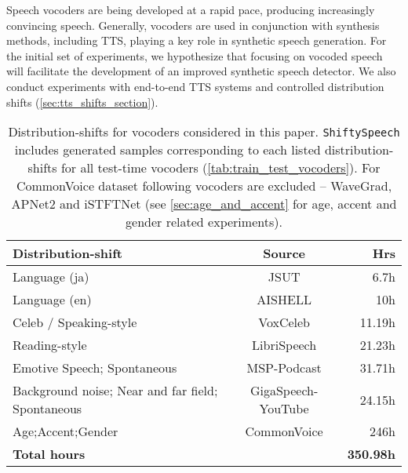Speech vocoders are being developed at a rapid pace,  producing increasingly convincing speech. Generally, vocoders are used in conjunction with synthesis methods, including TTS, playing a key role in synthetic speech generation. For the initial set of experiments, we hypothesize that focusing on vocoded speech will facilitate the development of an improved synthetic speech detector. We also conduct experiments with end-to-end TTS systems and controlled distribution shifts (\autoref{sec:tts_shifts_section}). 

\begin{table*}[htb]
    \caption{Distribution-shifts for vocoders considered in this paper. \texttt{ShiftySpeech} includes generated samples corresponding to each listed distribution-shifts for all test-time vocoders (\autoref{tab:train_test_vocoders}). For CommonVoice dataset following vocoders are excluded -- WaveGrad, APNet2 and iSTFTNet (see \autoref{sec:age_and_accent} for age, accent and gender related experiments).}
    \label{tab:shifty_speech_vocoders}
    \vskip 0.15in
\begin{center}
\begin{small}
\begin{sc}
    \begin{tabular}{lcr}
    \toprule
Distribution-shift  & Source & Hrs\\ 
    \midrule
    Language (ja) & JSUT & 6.7h\\ 
    \hline
     Language (en) & AISHELL & 10h\\ 
    \hline 
    Celeb / Speaking-style & VoxCeleb & 11.19h\\ 
    \hline 
    Reading-style & LibriSpeech & 21.23h\\
    \hline
    Emotive Speech; Spontaneous & MSP-Podcast & 31.71h \\ 
    \hline 
    Background noise; Near and far field; Spontaneous  & GigaSpeech-YouTube & 24.15h \\
    \hline 
    Age;Accent;Gender &CommonVoice &246h \\
    \hline 
    \textbf{Total hours} & & \textbf{350.98h} \\ 
      \bottomrule 
    \end{tabular}
    \end{sc}
\end{small}
\end{center}
\vskip -0.1in
\end{table*}

